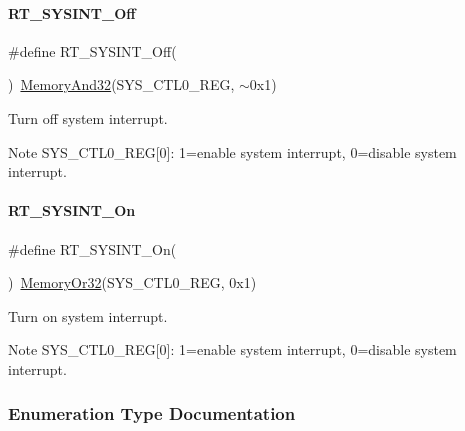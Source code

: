 \paragraph{\texorpdfstring{R\+T\+\_\+\+S\+Y\+S\+I\+N\+T\+\_\+\+Off}{RT\_SYSINT\_Off}}
{\footnotesize\ttfamily \#define R\+T\+\_\+\+S\+Y\+S\+I\+N\+T\+\_\+\+Off(\begin{DoxyParamCaption}{ }\end{DoxyParamCaption})~\mbox{\hyperlink{a00020_ad87cedffcaadc51db22594fce55173d4}{Memory\+And32}}(S\+Y\+S\+\_\+\+C\+T\+L0\+\_\+\+R\+EG, $\sim$0x1)}



Turn off system interrupt. 

\begin{DoxyNote}{Note}
S\+Y\+S\+\_\+\+C\+T\+L0\+\_\+\+R\+EG\mbox{[}0\mbox{]}\+: 1=enable system interrupt, 0=disable system interrupt. 
\end{DoxyNote}
\mbox{\label{a00011_a5ddacb2147f802d2af2f507e41043504}} 
\paragraph{\texorpdfstring{R\+T\+\_\+\+S\+Y\+S\+I\+N\+T\+\_\+\+On}{RT\_SYSINT\_On}}
{\footnotesize\ttfamily \#define R\+T\+\_\+\+S\+Y\+S\+I\+N\+T\+\_\+\+On(\begin{DoxyParamCaption}{ }\end{DoxyParamCaption})~\mbox{\hyperlink{a00020_a27874a97deab7cecdde5ddecf466e31e}{Memory\+Or32}}(S\+Y\+S\+\_\+\+C\+T\+L0\+\_\+\+R\+EG, 0x1)}



Turn on system interrupt. 

\begin{DoxyNote}{Note}
S\+Y\+S\+\_\+\+C\+T\+L0\+\_\+\+R\+EG\mbox{[}0\mbox{]}\+: 1=enable system interrupt, 0=disable system interrupt. 
\end{DoxyNote}


\subsubsection{Enumeration Type Documentation}
\mbox{\label{a00011_af11f5754cc92430795a63bb53d964cd4}} 
